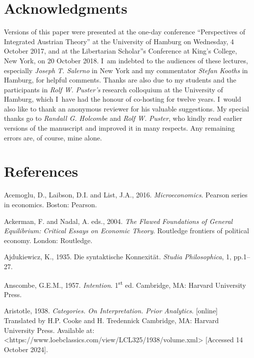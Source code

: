 \section{Acknowledgments}

Versions of this paper were presented at the one-day conference ``Perspectives of Integrated Austrian Theory'' at the University of Hamburg on Wednesday, 4 October 2017, and at the Libertarian Scholar''s Conference at King's College, New York, on 20 October 2018. I~am indebted to the audiences of these lectures, especially \textit{Joseph T. Salerno} in New York and my commentator \textit{Stefan Kooths} in Hamburg, for helpful comments. Thanks are also due to my students and the participants in \textit{Rolf W. Puster's} research colloquium at the University of Hamburg, which I~have had the honour of co-hosting for twelve years. I~would also like to thank an anonymous reviewer for his valuable suggestions. My special thanks go to \textit{Randall G. Holcombe} and \textit{Rolf W. Puster}, who kindly read earlier versions of the manuscript and improved it in many respects. Any remaining errors are, of course, mine alone.



\section{References}

Acemoglu, D., Laibson, D.I. and List, J.A., 2016. \textit{Microeconomics}. Pearson series in economics. Boston: Pearson.



Ackerman, F. and Nadal, A. eds., 2004. \textit{The Flawed Foundations of General Equilibrium: Critical Essays on Economic Theory}. Routledge frontiers of political economy. London: Routledge.



Ajdukiewicz, K., 1935. Die syntaktische Konnexität. \textit{Studia Philosophica}, 1, pp.1–27.



Anscombe, G.E.M., 1957. \textit{Intention}. 1\textsuperscript{st} ed. Cambridge, MA: Harvard University Press.



Aristotle, 1938. \textit{Categories. On Interpretation. Prior Analytics}. [online] Translated by H.P. Cooke and H. Tredennick Cambridge, MA: Harvard University Press. Available at: {\textless}https://www.loebclassics.com/view/LCL325/1938/volume.xml{\textgreater} [Accessed 14 October 2024].



